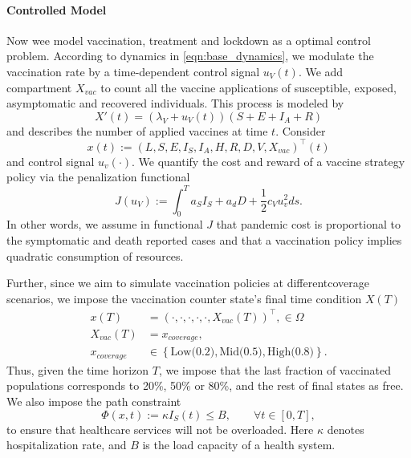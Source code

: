 \paragraph{Controlled Model}
Now wee model vaccination, treatment and lockdown as a optimal control problem.
According to dynamics in \cref{eqn:base_dynamics}, we modulate the vaccination
rate by a time-dependent control signal  $u_V(t)$. We add  
compartment $X_{vac}$
to count all the vaccine applications of susceptible, exposed, asymptomatic and
recovered individuals. This process is modeled by
\begin{equation}
\label{eqn:counter}
  X'(t) =
    (\lambda_V + u_V(t))(S + E + I_A + R)
\end{equation}
and describes the number of applied vaccines at time $t$.
Consider
$$x(t):= (L, S, E, I_S, I_A, H, R, D, V, X_{vac})^{\top}(t)$$
and  control signal $u_v(\cdot)$. We quantify the cost and reward of a vaccine
strategy policy via the penalization functional
\begin{equation}
\label{eqn:cost_functional}
J(u_V):=
  \int _0 ^ T
  a_S I_S + a_d D +
  \frac{1}{2}
    c_V u_v^2
  ds.
\end{equation}
In other words, we assume in functional $J$ that pandemic cost is proportional 
to the symptomatic and death reported cases and that a vaccination policy
implies quadratic consumption of resources.

    Further, since we aim to simulate vaccination policies at differentcoverage
scenarios, we impose the vaccination counter state's final time condition 
$X(T)$
\begin{equation}
    \begin{aligned}
      x(T) &= (\cdot, \cdot, \cdot, \cdot, \cdot, X_{vac }(T))^{\top},
      \in \Omega
      \\
      X_{vac}(T)
        &= x_{cover age},
      \\
      x_{coverage}
        & \in
        \left \{
          \text{Low(0.2)},\text{Mid(0.5)}, \text{High(0.8)}
        \right \} .
    \end{aligned}
\end{equation}
    Thus, given the time horizon $T$, we impose that the last fraction of
vaccinated populations corresponds to 20\%, 50\% or 80\%, and
the rest of final states as free. We also impose the path constraint
\begin{equation}
    \label{eqn:path_constrain}
    \Phi(x,t):= \kappa I_S(t) \leq B,
    \qquad \forall t \in [0, T],
\end{equation}
to ensure that healthcare services will not be overloaded. Here $\kappa$
denotes hospitalization rate, and $B$ is the load capacity of a
health system.


